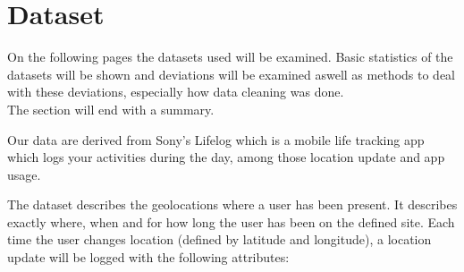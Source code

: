 \chapter{Dataset}
\label{chap:dataset}
On the following pages the datasets used will be examined. Basic statistics of the datasets will be shown and deviations will be examined aswell as methods to deal with these deviations, especially how data cleaning was done. \\
The section will end with a summary. 

Our data are derived from Sony's Lifelog\cite{sonyLifeLog} which is a mobile life tracking app which logs your activities during the day, among those location update and app usage. 

The dataset describes the geolocations where a user has been present. It describes exactly where, when and for how long the user has been on the defined site. Each time the user changes location (defined by latitude and longitude), a location update will be logged with the following attributes: 

